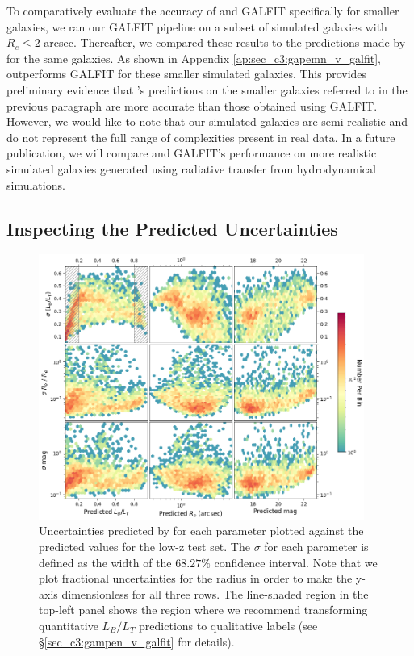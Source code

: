 To comparatively evaluate the accuracy of \gampen{} and GALFIT specifically for smaller galaxies, we ran our GALFIT pipeline on a subset of simulated galaxies with $R_e \leq 2$ arcsec. Thereafter, we compared these results to the predictions made by \gampen{} for the same galaxies. As shown in Appendix \ref{ap:sec_c3:gapemn_v_galfit}, \gampen{} outperforms GALFIT for these smaller simulated galaxies. This provides preliminary evidence that \gampen{}'s predictions on the smaller galaxies referred to in the previous paragraph are more accurate than those obtained using GALFIT. However, we would like to note that our simulated galaxies are semi-realistic and do not represent the full range of complexities present in real data. In a future publication, we will compare \gampen{} and GALFIT's performance on more realistic simulated galaxies generated using radiative transfer from hydrodynamical simulations.

\subsection{Inspecting the Predicted Uncertainties} \label{sec_c3:uncertainties}

\begin{figure}[htb]
    \centering
    \includegraphics[width = 0.95\textwidth]{2d_uncer_low_z.png}
    \caption{Uncertainties predicted by \gampen{} for each parameter plotted against the predicted values for the low-z test set. The $\sigma$ for each parameter is defined as the width of the $68.27\%$ confidence interval. Note that we plot fractional uncertainties for the radius in order to make the y-axis dimensionless for all three rows. The line-shaded region in the top-left panel shows the region where we recommend transforming quantitative $L_B/L_T$ predictions to qualitative labels (see \S \ref{sec_c3:gampen_v_galfit} for details).}
    \label{fig_c3:2d_uncer_low_z}
\end{figure}

